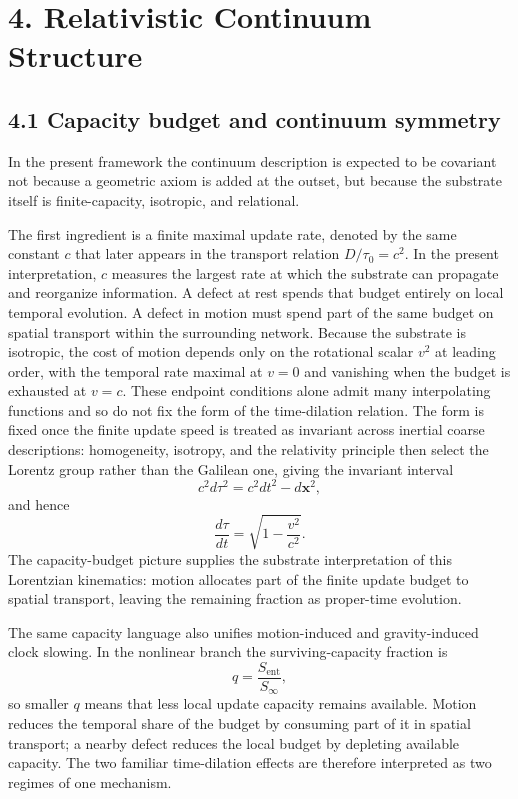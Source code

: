 \documentclass[11pt]{article}
\begin{document}
\section{4. Relativistic Continuum Structure}

\subsection{4.1 Capacity budget and continuum symmetry}

In the present framework the continuum description is expected to be covariant not because a geometric axiom is added at the outset, but because the substrate itself is finite-capacity, isotropic, and relational.

The first ingredient is a finite maximal update rate, denoted by the same constant $c$ that later appears in the transport relation $D/\tau_0=c^2$. In the present interpretation, $c$ measures the largest rate at which the substrate can propagate and reorganize information. A defect at rest spends that budget entirely on local temporal evolution. A defect in motion must spend part of the same budget on spatial transport within the surrounding network. Because the substrate is isotropic, the cost of motion depends only on the rotational scalar $v^2$ at leading order, with the temporal rate maximal at $v=0$ and vanishing when the budget is exhausted at $v=c$. These endpoint conditions alone admit many interpolating functions and so do not fix the form of the time-dilation relation. The form is fixed once the finite update speed is treated as invariant across inertial coarse descriptions: homogeneity, isotropy, and the relativity principle then select the Lorentz group rather than the Galilean one, giving the invariant interval
\[
c^2 d\tau^2 = c^2 dt^2 - d\mathbf{x}^2,
\]
and hence
\[
\frac{d\tau}{dt}=\sqrt{1-\frac{v^2}{c^2}}.
\]
The capacity-budget picture supplies the substrate interpretation of this Lorentzian kinematics: motion allocates part of the finite update budget to spatial transport, leaving the remaining fraction as proper-time evolution.

The same capacity language also unifies motion-induced and gravity-induced clock slowing. In the nonlinear branch the surviving-capacity fraction is
\[
q=\frac{S_{\mathrm{ent}}}{S_\infty},
\]
so smaller $q$ means that less local update capacity remains available. Motion reduces the temporal share of the budget by consuming part of it in spatial transport; a nearby defect reduces the local budget by depleting available capacity. The two familiar time-dilation effects are therefore interpreted as two regimes of one mechanism.
\end{document}
